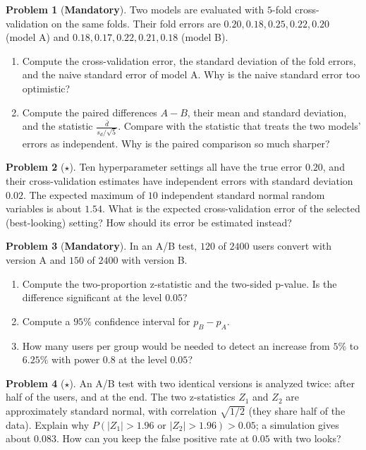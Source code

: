 \documentclass[11pt]{article}
\theoremstyle{definition}
\newtheorem{problem}{Problem}[section]
\newcommand{\mandatory}{\textcolor{red!70!black}{\textbf{Mandatory}}}
\begin{document}
\begin{problem}[\mandatory]\label{pr:cv-stats}
    Two models are evaluated with $5$-fold cross-validation on the same folds. Their fold errors are $0.20, 0.18, 0.25, 0.22, 0.20$ (model A) and $0.18, 0.17, 0.22, 0.21, 0.18$ (model B).
    \begin{enumerate}[label=(\alph*)]
        \item Compute the cross-validation error, the standard deviation of the fold errors, and the naive standard error of model A. Why is the naive standard error too optimistic?
        \item Compute the paired differences $A - B$, their mean and standard deviation, and the statistic $\frac{\bar d}{s_d/\sqrt{5}}$. Compare with the statistic that treats the two models' errors as independent. Why is the paired comparison so much sharper?
    \end{enumerate}
\end{problem}

\begin{problem}[$\star$]\label{pr:winners-curse}
    Ten hyperparameter settings all have the true error $0.20$, and their cross-validation estimates have independent errors with standard deviation $0.02$. The expected maximum of $10$ independent standard normal random variables is about $1.54$. What is the expected cross-validation error of the selected (best-looking) setting? How should its error be estimated instead?
\end{problem}

\begin{problem}[\mandatory]\label{pr:ab-test}
    In an A/B test, $120$ of $2400$ users convert with version A and $150$ of $2400$ with version B.
    \begin{enumerate}[label=(\alph*)]
        \item Compute the two-proportion z-statistic and the two-sided p-value. Is the difference significant at the level $0.05$?
        \item Compute a $95\%$ confidence interval for $p_B - p_A$.
        \item How many users per group would be needed to detect an increase from $5\%$ to $6.25\%$ with power $0.8$ at the level $0.05$?
    \end{enumerate}
\end{problem}

\begin{problem}[$\star$]\label{pr:peeking}
    An A/B test with two identical versions is analyzed twice: after half of the users, and at the end. The two z-statistics $Z_1$ and $Z_2$ are approximately standard normal, with correlation $\sqrt{1/2}$ (they share half of the data). Explain why $P(|Z_1| > 1.96 \text{ or } |Z_2| > 1.96) > 0.05$; a simulation gives about $0.083$. How can you keep the false positive rate at $0.05$ with two looks?
\end{problem}
\end{document}
